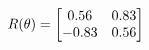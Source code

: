 \documentclass[preview]{standalone}
\begin{document}
\begin{align*}
\special{dvisvgm:raw <g id='unique000'>}R(\theta) = \begin{bmatrix}0.56 & 0.83\\-0.83 & 0.56\end{bmatrix}\special{dvisvgm:raw </g>}
\end{align*}
\end{document}
